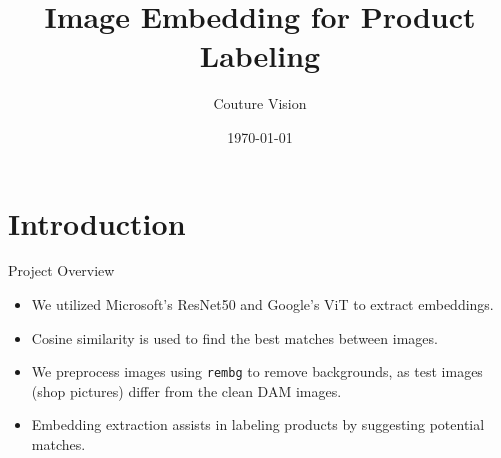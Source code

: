 \documentclass{beamer}
\title{Image Embedding for Product Labeling}
\author{Couture Vision}
\date{\today}
\begin{document}
\frame{\titlepage}

\section{Introduction}
\begin{frame}{Project Overview}
\begin{itemize}
    \item We utilized Microsoft's ResNet50 and Google's ViT to extract embeddings.
    \item Cosine similarity is used to find the best matches between images.
    \item We preprocess images using \texttt{rembg} to remove backgrounds, as test images (shop pictures) differ from the clean DAM images.
    \item Embedding extraction assists in labeling products by suggesting potential matches.
\end{itemize}
\end{frame}
\end{document}

